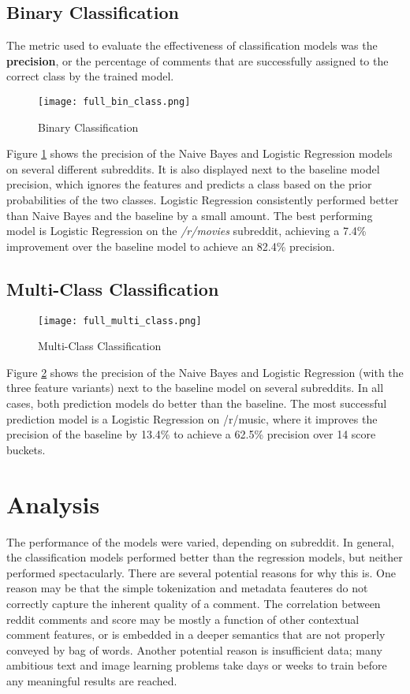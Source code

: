 \documentclass[11pt, twocolumn]{article}
\begin{document}
	\subsection{Binary Classification}
	The metric used to evaluate the effectiveness of classification models was the \textbf{precision}, or the percentage of comments that are successfully assigned to the correct class by the trained model.
	
	\begin{figure}[h!]
	\centering
	\texttt{[image: full\_bin\_class.png]}
	\caption{Binary Classification}
	\label{full_bin_class}
	\end{figure}
	
	Figure \ref{full_bin_class} shows the precision of the Naive Bayes and Logistic Regression models on several different subreddits. It is also displayed next to the baseline model precision, which ignores the features and predicts a class based on the prior probabilities of the two classes. Logistic Regression consistently performed better than Naive Bayes and the baseline by a small amount. The best performing model is Logistic Regression on the \textit{/r/movies} subreddit, achieving a 7.4\% improvement over the baseline model to achieve an 82.4\% precision.

	\subsection{Multi-Class Classification}
	
	\begin{figure}[h!]
	\centering
	\texttt{[image: full\_multi\_class.png]}
	\caption{Multi-Class Classification}
	\label{full_multi_class}
	\end{figure}

	Figure \ref{full_multi_class} shows the precision of the Naive Bayes and Logistic Regression (with the three feature variants) next to the baseline model on several subreddits. In all cases, both prediction models do better than the baseline. The most successful prediction model is a Logistic Regression on /r/music, where it improves the precision of the baseline by 13.4\% to achieve a 62.5\% precision over 14 score buckets.
	
\section{Analysis}

	The performance of the models were varied, depending on subreddit. In general, the classification models performed better than the regression models, but neither performed spectacularly. There are several potential reasons for why this is. One reason may be that the simple tokenization and metadata feauteres do not correctly capture the inherent quality of a comment. The correlation between reddit comments and score may be mostly a function of other contextual comment features, or is embedded in a deeper semantics that are not properly conveyed by bag of words. Another potential reason is insufficient data; many ambitious text and image learning problems take days or weeks to train before any meaningful results are reached.
\end{document}

